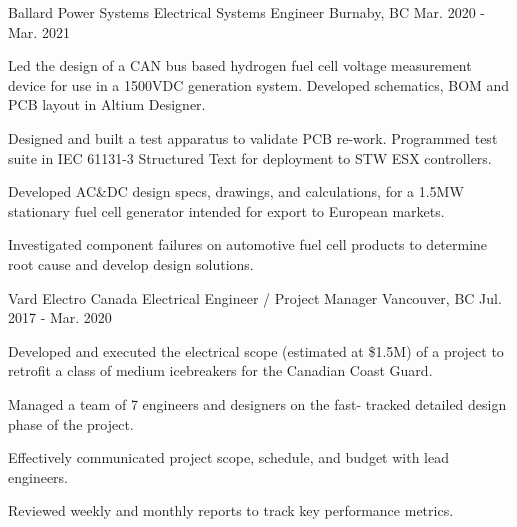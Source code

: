 \begin{cventries}
    \cventry
    {Ballard Power Systems} %
    {Electrical Systems Engineer} %
    {Burnaby, BC} %
    {Mar. 2020 - Mar. 2021} %
    { %
        \begin{cvitems}
            \item {Led the design of a CAN bus based hydrogen fuel cell voltage measurement device for use in a 1500VDC generation system. Developed schematics, BOM and PCB layout in Altium Designer.}
            \item {Designed and built a test apparatus to validate PCB re-work. Programmed test suite in IEC 61131-3 Structured Text for deployment to STW ESX controllers.}
            \item {Developed AC\&DC design specs, drawings, and calculations, for a 1.5MW stationary fuel cell generator intended for export to European markets.}
            \item {Investigated component failures on automotive fuel cell products to determine root cause and develop design solutions.}
        \end{cvitems}
        \vspace{3mm}
        \vspace{1mm}
    }

    \cventry
    {Vard Electro Canada} %
    {Electrical Engineer / Project Manager} %
    {Vancouver, BC} %
    {Jul. 2017 - Mar. 2020} %
    { %
        \begin{cvitems}
            \item {Developed and executed the electrical scope (estimated at \$1.5M) of a project to retrofit a class of medium icebreakers for the Canadian Coast Guard.}
            \item {Managed a team of 7 engineers and designers on the fast- tracked detailed design phase of the project.}
            \item {Effectively communicated project scope, schedule, and budget with lead engineers.}
            \item {Reviewed weekly and monthly reports to track key performance metrics.}
        \end{cvitems}
    \vspace{5mm}
    }


\end{cventries}

